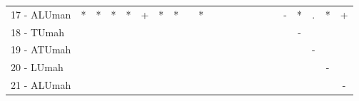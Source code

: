 \begin{table}[h]
\begin{center}
\begin{tabular}{lcc|cc|cc|cc|cc|cc|cc|cc|cc|cc|c}
17 - ALUman	& * & * & * & * & + & * & * &   & * &   &   &   &   &   &   &   & - & * & . & * & + \\
18 - TUmah	&   &   &   &   &   &   &   &   &   &   &   &   &   &   &   &   &   & - &   &   &   \\ \hline
19 - ATUmah	&   &   &   &   &   &   &   &   &   &   &   &   &   &   &   &   &   &   & - &   &   \\
20 - LUmah	&   &   &   &   &   &   &   &   &   &   &   &   &   &   &   &   &   &   &   & - &   \\ \hline
21 - ALUmah	&   &   &   &   &   &   &   &   &   &   &   &   &   &   &   &   &   &   &   &   & - \\\end{tabular}
\label{stratsALCKappaFriedNB}
\end{center}
\end{table}